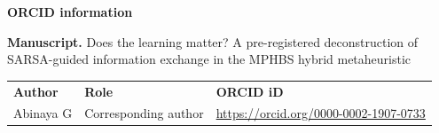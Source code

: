 \documentclass[11pt]{article}
\begin{document}
{\large\bfseries ORCID information}

\textbf{Manuscript.} Does the learning matter? A pre-registered deconstruction of SARSA-guided information exchange
in the MPHBS hybrid metaheuristic

\begin{tabular}{@{}lll@{}}
\textbf{Author} & \textbf{Role} & \textbf{ORCID iD} \\[2pt]
Abinaya G & Corresponding author & \href{https://orcid.org/0000-0002-1907-0733}{https://orcid.org/0000-0002-1907-0733} \\
\end{tabular}
\end{document}
